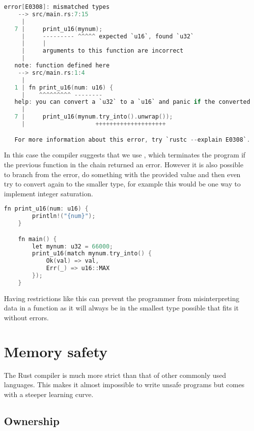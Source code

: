 \begin{lstlisting}[language=C,frame=single,float=!ht,label={lst:rust-reverse-conv-error},caption={Rust Type Conversion Error}]
    error[E0308]: mismatched types
    --> src/main.rs:7:15
     |
   7 |     print_u16(mynum);
     |     --------- ^^^^^ expected `u16`, found `u32`
     |     |
     |     arguments to this function are incorrect
     |
   note: function defined here
    --> src/main.rs:1:4
     |
   1 | fn print_u16(num: u16) {
     |    ^^^^^^^^^ --------
   help: you can convert a `u32` to a `u16` and panic if the converted value doesn't fit
     |
   7 |     print_u16(mynum.try_into().unwrap());
     |                    ++++++++++++++++++++

   For more information about this error, try `rustc --explain E0308`.
\end{lstlisting}

In this case the compiler suggests that we use , which terminates the program if the previous function in the chain returned an error. However it is also possible to branch from the error, do something with the provided value and then even try to convert again to the smaller type, for example this would be one way to implement integer saturation.

\begin{lstlisting}[language=C,frame=single,float=!ht,label={lst:rust-cap-integer},caption={Branching from an Error}]
    fn print_u16(num: u16) {
        println!("{num}");
    }

    fn main() {
        let mynum: u32 = 66000;
        print_u16(match mynum.try_into() {
            Ok(val) => val,
            Err(_) => u16::MAX
        });
    }
\end{lstlisting}

Having restrictions like this can prevent the programmer from misinterpreting data in a function as it will always be in the smallest type possible that fits it without errors.

\section{Memory safety}

The Rust compiler is much more strict than that of other commonly used languages. This makes it almost impossible to write unsafe programs but comes with a steeper learning curve.

\subsection{Ownership}

